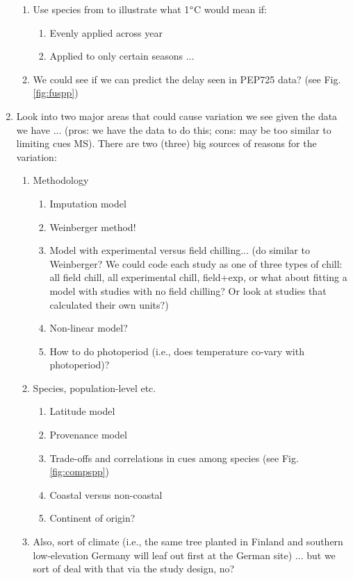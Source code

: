 \documentclass[11pt,letterpaper]{article}
\begin{document}
\begin{enumerate}
\begin{enumerate}
\item Use species from \citep{fu2015} to illustrate what 1$\degree$C would mean if:
\begin{enumerate}
\item Evenly applied across year
\item Applied to only certain seasons ... 
\end{enumerate}
\item We could see if we can predict the delay seen in PEP725 data? (see Fig. \ref{fig:fuspp})
\end{enumerate}
\item Look into two major areas that could cause variation we see given the data we have ... (pros: we have the data to do this; cons: may be too similar to limiting cues MS). There are two (three) big sources of reasons for the variation:
\begin{enumerate}
\item Methodology
\begin{enumerate}
\item Imputation model
\item Weinberger method! 
\item Model with experimental versus field chilling... (do similar to Weinberger? We could code each study as one of three types of chill: all field chill, all experimental chill, field+exp, or what about fitting a model with studies with no field chilling? Or look at studies that calculated their own units?)
\item Non-linear model?
\item How to do photoperiod (i.e., does temperature co-vary with photoperiod)?
\end{enumerate}
\item Species, population-level etc.
\begin{enumerate}
\item Latitude model
\item Provenance model
\item Trade-offs and correlations in cues among species (see Fig. \ref{fig:compspp})
\item Coastal versus non-coastal
\item Continent of origin?
\end{enumerate}
\item Also, sort of climate (i.e., the same tree planted in Finland and southern low-elevation Germany will leaf out first at the German site) ... but we sort of deal with that via the study design, no?
\end{enumerate}
\end{enumerate}
\end{document}
